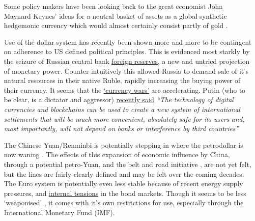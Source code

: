  Some policy makers have been looking back to the great economist John Maynard Keynes' ideas for a neutral basket of assets as a global synthetic hedgemonic currency \cite{carney2019growing, piffaretti2009reshaping} which would almost certainly consist partly of gold \cite{stoeferle2018gold}.\par
Use of the dollar system has recently been shown more and more to be contingent on adherence to US defined political principles. This is evidenced most starkly by the seizure of Russian central bank \href{https://twitter.com/RussianEmbassy/status/1504530573527760909}{foreign reserves}, a new and untried projection of monetary power. Counter intuitively this allowed Russia to demand sale of it's natural resources in their native Ruble, rapidly increasing the buying power of their currency. It seems that the \href{https://mronline.org/2022/04/16/russias-sergey-glazyev-introduces-the-new-global-financial-system/}{`currency wars'} are accelerating. Putin (who to be clear, is a dictator and aggressor) \href{https://finance.yahoo.com/news/russia-calls-payment-system-based-135512758.html}{recently said} \textit{``The technology of digital currencies and blockchains can be used to create a new system of international settlements that will be much more convenient, absolutely safe for its users and, most importantly, will not depend on banks or interference by third countries'' }\par  
The Chinese Yuan/Renminbi is potentially stepping in where the petrodollar is now waning \cite{mathews2018china}. The effects of this expansion of economic influence by China, through a potential petro-Yuan, and the belt and road initiative \cite{huang2016understanding}, are not yet felt, but the lines are fairly clearly defined and may be felt over the coming decades. The Euro system is potentially even less stable because of recent energy supply pressures, and \href{https://www.fitchratings.com/research/sovereigns/energy-crisis-increases-fiscal-risks-to-western-europe-sovereigns-23-09-2022}{internal tensions} in the bond markets. Though it seems to be less `weaponised' \cite{hudson2021destiny}, it comes with it's own restrictions for use, especially through the International Monetary Fund (IMF). 
